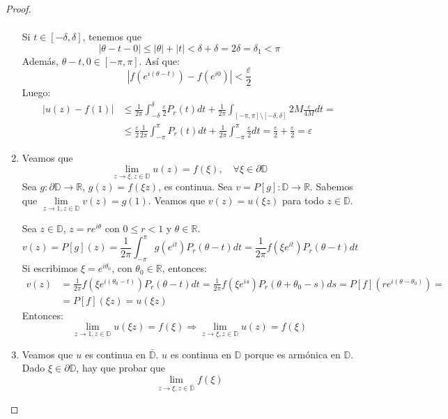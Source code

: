 \begin{proof}
\begin{enumerate}
\begin{align*}
              \end{align*}
              Si $t \in [-\delta, \delta]$, tenemos que
              $$|\theta-t-0| \leq |\theta| + |t| < \delta + \delta = 2\delta = \delta_1 < \pi$$
              Además, $\theta-t, 0 \in [-\pi, \pi]$.
              Así que:
              $$\left|f\left(e^{i(\theta-t)}\right) - f\left(e^{i0}\right)\right| < \frac{\varepsilon}{2}$$
              Luego:
              \begin{align*}
                  |u(z)-f(1)| & \leq \frac{1}{2\pi} \int_{-\delta}^\delta \frac{\varepsilon}{2}P_r(t)dt + \frac{1}{2\pi} \int_{[-\pi, \pi] \setminus [-\delta, \delta]} 2M\frac{\varepsilon}{4M}dt =                     \\
                              & \leq \frac{\varepsilon}{2}\frac{1}{2\pi} \int_{-\pi}^\pi P_r(t)dt + \frac{1}{2\pi} \int_{-\pi}^\pi \frac{\varepsilon}{2}dt = \frac{\varepsilon}{2} + \frac{\varepsilon}{2} = \varepsilon
              \end{align*}

        \item Veamos que
              $$\lim_{z \to \xi, z \in \mathbb{D}} u(z) = f(\xi), \quad \forall \xi \in \partial\mathbb{D}$$
              Sea $g: \partial\mathbb{D} \to \mathbb{R}$, $g(z) = f(\xi z)$, es continua.
              Sea $v = P[g]: \mathbb{D} \to \mathbb{R}$.
              Sabemos que $\lim\limits_{z \to 1, z \in \mathbb{D}} v(z) = g(1)$.
              Veamos que $v(z) = u(\xi z)$ para todo $z \in \mathbb{D}$.

              Sea $z \in \mathbb{D}$, $z = re^{i\theta}$ con $0 \leq r < 1$ y $\theta \in \mathbb{R}$.
              $$v(z) = P[g](z) = \frac{1}{2\pi} \int_{-\pi}^\pi g(e^{it})P_r(\theta-t)dt = \frac{1}{2\pi} f(\xi e^{it})P_r(\theta-t)dt$$
              Si escribimos $\xi = e^{i\theta_0}$, con $\theta_0 \in \mathbb{R}$, entonces:
              \begin{align*}
                  v(z) & = \frac{1}{2\pi} f(\xi e^{i(\theta_0-t)})P_r(\theta-t)dt = \frac{1}{2\pi} f(\xi e^{is})P_r(\theta+\theta_0-s)ds = P[f](re^{i(\theta-\theta_0)}) = \\
                       & = P[f](\xi z) = u(\xi z)
              \end{align*}
              Entonces:
              $$\lim_{z \to 1, z \in \mathbb{D}} u(\xi z) = f(\xi) \Rightarrow \lim_{z \to \xi, z \in \mathbb{D}} u(z) = f(\xi)$$

        \item Veamos que $u$ es continua en $\bar{\mathbb{D}}$.
              $u$ es continua en $\mathbb{D}$ porque es armónica en $\mathbb{D}$.
              Dado $\xi \in \partial\mathbb{D}$, hay que probar que
              $$\lim_{z \to \xi, z \in \bar{\mathbb{D}}} f(\xi)$$


\end{enumerate}
\end{proof}
